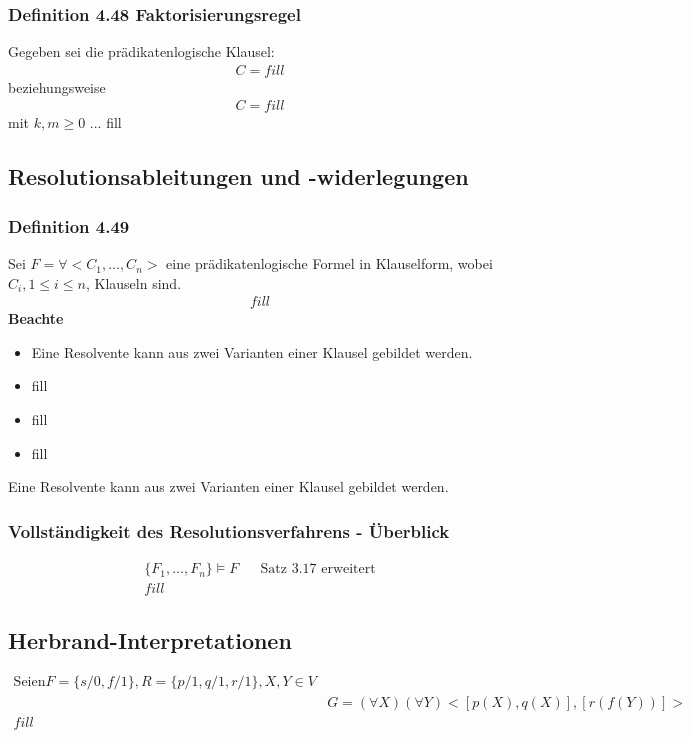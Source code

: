 \subsubsection{Definition 4.48 Faktorisierungsregel}
Gegeben sei die prädikatenlogische Klausel:
\begin{align*}
 C = fill
\end{align*}
beziehungsweise
\begin{align*}
C = fill
\end{align*}
mit \(k,m \ge 0 \) ... fill
\subsection{Resolutionsableitungen und -widerlegungen}
\subsubsection{Definition 4.49}
Sei \(F = \forall <C_1, \ldots , C_n>\) eine prädikatenlogische Formel in Klauselform, wobei \(C_i, 1 \le i \le n\), Klauseln sind.
\begin{align*}
	fill
\end{align*}
\textbf{Beachte}\\
\begin{itemize}
\item Eine Resolvente kann aus zwei Varianten einer Klausel gebildet werden.
\item fill
\item fill
\item fill
\end{itemize}
Eine Resolvente kann aus zwei Varianten einer Klausel gebildet werden.
\subsubsection{Vollständigkeit des Resolutionsverfahrens - Überblick}
\begin{align*}
\{F_1, \ldots ,F_n\} \vDash F &&\text{Satz 3.17 erweitert}\\
fill
\end{align*}
\subsection{Herbrand-Interpretationen}
\begin{align*}
\text{Seien} F = \{s/0, f/1\}, R = \{p/1, q/1, r/1\}, X,Y \in V\\
&G = (\forall X)(\forall Y)<[p(X), q(X)], [r(f(Y))]>\\
fill
\end{align*}
